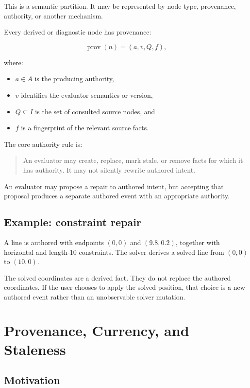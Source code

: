 \documentclass[11pt]{article}
\begin{document}
This is a semantic partition. It may be represented by node type, provenance,
authority, or another mechanism.

Every derived or diagnostic node has provenance:

\[
\operatorname{prov}(n)=(a,v,Q,f),
\]

where:

\begin{itemize}
  \item $a\in A$ is the producing authority,
  \item $v$ identifies the evaluator semantics or version,
  \item $Q\subseteq I$ is the set of consulted source nodes, and
  \item $f$ is a fingerprint of the relevant source facts.
\end{itemize}

The core authority rule is:

\begin{quote}
An evaluator may create, replace, mark stale, or remove facts for which it has
authority. It may not silently rewrite authored intent.
\end{quote}

An evaluator may propose a repair to authored intent, but accepting that
proposal produces a separate authored event with an appropriate authority.

\subsection{Example: constraint repair}

A line is authored with endpoints $(0,0)$ and $(9.8,0.2)$, together with
horizontal and length-10 constraints. The solver derives a solved line from
$(0,0)$ to $(10,0)$.

The solved coordinates are a derived fact. They do not replace the authored
coordinates. If the user chooses to apply the solved position, that choice is a
new authored event rather than an unobservable solver mutation.

\section{Provenance, Currency, and Staleness}

\subsection{Motivation}
\end{document}
